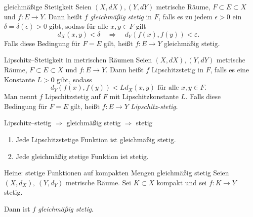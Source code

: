 \begin{definition}{gleichmäßige Stetigkeit}
    Seien $(X, dX), (Y, dY )$ metrische Räume, $F \subset E \subset X$ und $f : E \to Y$.
    Dann heißt $f$ \emph{gleichmäßig stetig} in $F$, falls es zu jedem $\epsilon > 0$ ein  $\delta = \delta(\epsilon) > 0$ gibt, sodass für alle $x, y \in F$ gilt
    $$
        d_X(x,y) < \delta \quad\Rightarrow\quad d_Y(f(x),f(y)) < \varepsilon.
    $$
    Falls diese Bedingung für $F = E$ gilt, heißt $f : E \to Y$ gleichmäßig stetig.
\end{definition}

\begin{definition}{Lipschitz--Stetigkeit in metrischen Räumen}
    Seien $(X, dX), (Y, dY )$ metrische Räume, $F \subset E \subset X$ und $f : E \to Y$.
    Dann heißt $f$ Lipschitzstetig in $F$, falls es eine Konstante $L > 0$ gibt, sodass
    $$
        d_{Y}(f(x),f(y)) < Ld_{X}(x,y) \text{ für alle } x,y \in F.
    $$
    Man nennt $f$ Lipschitzstetig auf $F$ mit Lipschitzkonstante $L$. Falls diese Bedingung für $F = E$ gilt, heißt $f : E \to Y$ \emph{Lipschitz-stetig}.
\end{definition}

\begin{satz}{Lipschitz--stetig $\Rightarrow$ gleichmäßig stetig $\Rightarrow$ stetig}
    \begin{enumerate}%
        \item Jede Lipschitzstetige Funktion ist gleichmäßig stetig.
        \item Jede gleichmäßig stetige Funktion ist stetig.
    \end{enumerate}  
\end{satz}

\begin{satz}{Heine: stetige Funktionen auf kompakten Mengen gleichmäßig stetig}
    Seien $(X,d_X),\ (Y,d_Y)$ metrische Räume. Sei $K\subset X$ kompakt und sei $f\colon K\to Y$ stetig.

    \vspace{0.5em}

    Dann ist $f$ \emph{gleichmäßig stetig}.    
\end{satz}